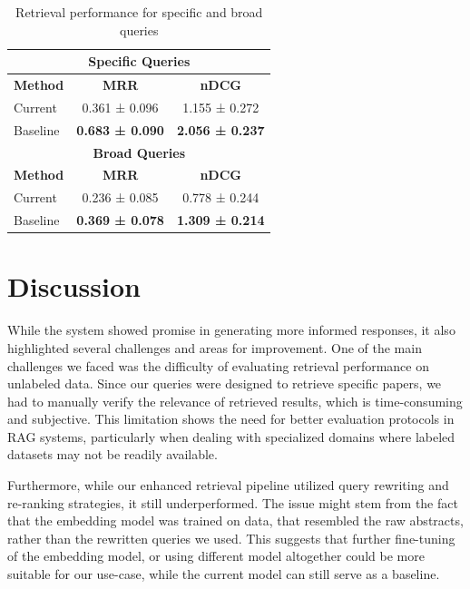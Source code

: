 \documentclass[fleqn,moreauthors,10pt]{ds_report}
\begin{document}
\begin{table}[h]
\centering
\caption{Retrieval performance for specific and broad queries}
\begin{tabular}{l|c|c}
\toprule
\multicolumn{3}{c}{\textbf{Specific Queries}} \\
\midrule
\textbf{Method} & \textbf{MRR} & \textbf{nDCG} \\
\midrule
Current  & 0.361 ± 0.096 & 1.155 ± 0.272 \\
Baseline & \textbf{0.683 ± 0.090} & \textbf{2.056 ± 0.237} \\
\midrule[0.8pt]
\multicolumn{3}{c}{\textbf{Broad Queries}} \\
\midrule
\textbf{Method} & \textbf{MRR} & \textbf{nDCG} \\
\midrule
Current  & 0.236 ± 0.085 & 0.778 ± 0.244 \\
Baseline & \textbf{0.369 ± 0.078} & \textbf{1.309 ± 0.214} \\
\bottomrule
\end{tabular}
\end{table}






\section*{Discussion}
While the system showed promise in generating more informed responses, it also highlighted several challenges and areas for improvement.
One of the main challenges we faced was the difficulty of evaluating retrieval performance on unlabeled data. Since our queries were designed to retrieve specific papers, we had to manually verify the relevance of retrieved results, which is time-consuming and subjective. This limitation shows the need for better evaluation protocols in RAG systems, particularly when dealing with specialized domains where labeled datasets may not be readily available.

Furthermore, while our enhanced retrieval pipeline utilized query rewriting and re-ranking strategies, it still underperformed. The issue might stem from the fact that the embedding model was trained on data, that resembled the raw abstracts, rather than the rewritten queries we used. This suggests that further fine-tuning of the embedding model, or using different model altogether could be more suitable for our use-case, while the current model can still serve as a baseline.
\end{document}
